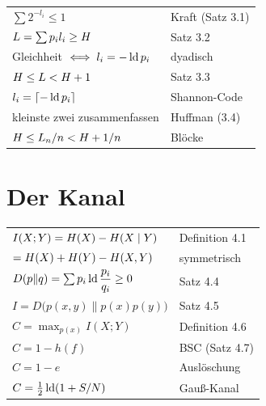 \begin{merksatz}
\begin{center}
{\small
\renewcommand{\arraystretch}{1.62}
\begin{tabular}{@{}P{4.4cm}P{4.2cm}@{}}
\toprule
$\sum 2^{-l_i} \le 1$ & Kraft (Satz 3.1)\\
$L = \sum p_i l_i \ge H$ & Satz 3.2\\
Gleichheit $\iff l_i = -\operatorname{ld} p_i$ & dyadisch\\
$H \le L < H+1$ & Satz 3.3\\
$l_i = \lceil-\operatorname{ld} p_i\rceil$ & Shannon-Code\\
kleinste zwei zusammenfassen & Huffman (3.4)\\
$H \le L_n/n < H+1/n$ & Blöcke\\
\bottomrule
\end{tabular}}
\end{center}
\end{merksatz}

\section{Der Kanal}

\begin{merksatz}
\begin{center}
{\small
\renewcommand{\arraystretch}{1.62}
\begin{tabular}{@{}P{4.4cm}P{4.2cm}@{}}
\toprule
$I(X;Y) = H(X)-H(X\mid Y)$ & Definition 4.1\\
$= H(X)+H(Y)-H(X,Y)$ & symmetrisch\\
$D(p\|q) = \sum p_i\operatorname{ld}\dfrac{p_i}{q_i} \ge 0$ & Satz 4.4\\
$I = D\bigl(p(x,y)\|p(x)p(y)\bigr)$ & Satz 4.5\\
$C = \max_{p(x)} I(X;Y)$ & Definition 4.6\\
$C = 1-h(f)$ & BSC (Satz 4.7)\\
$C = 1-e$ & Auslöschung\\
$C = \frac12\operatorname{ld}(1+S/N)$ & Gauß-Kanal\\
\bottomrule
\end{tabular}}
\end{center}
\end{merksatz}

